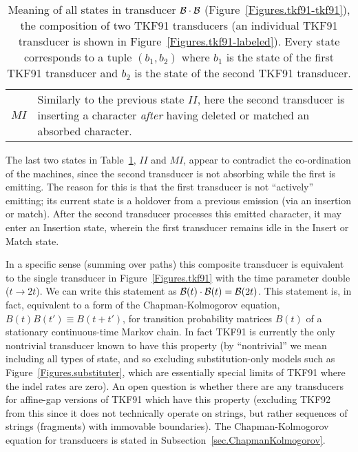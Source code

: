 \documentclass{article}
\newcommand{\secref}[1]{Subsection~\ref{sec.#1}}
\newcommand{\tabnum}[1]{\ref{tab.#1}}
\newcommand{\tabref}[1]{Table~\tabnum{#1}}
\newcommand{\tablabel}[1]{\label{tab.#1}}
\newcommand{\figref}[1]{Figure~\ref{Figures.#1}}
\newcommand\tkf{{\cal B}}
\begin{document}
\begin{table}
\begin{tabular}{c|p{}}
$MI$ & Similarly to the previous state $II$, here the second transducer is inserting a character {\em after} having deleted or matched an absorbed character. \\
\end{tabular}
\caption{ \tablabel{tkf91-tkf91} Meaning of all states in
transducer $\tkf \cdot \tkf$ (\figref{tkf91-tkf91}),
the composition of two TKF91 transducers
(an individual TKF91 transducer is shown in \figref{tkf91-labeled}).
Every state corresponds to a tuple $(b_1,b_2)$
where
$b_1$ is the state of the first TKF91 transducer and
$b_2$ is the state of the second TKF91 transducer.
 }
\end{table}

The last two states in \tabref{tkf91-tkf91}, $II$ and $MI$, appear to contradict the co-ordination of the machines, 
since the second transducer is not absorbing while the first is emitting. 
The reason for this is that the first transducer is not ``actively'' emitting; 
its current state is a holdover from a previous emission (via an insertion or match). 
After the second transducer processes this emitted character, it may enter an Insertion 
state, wherein the first transducer remains idle in the Insert or Match state. 



In a specific sense (summing over paths)
this composite transducer is equivalent to the single transducer in \figref{tkf91}
with the time parameter double ($t \to 2t$).
We can write this statement as $\tkf(t) \cdot \tkf(t) = \tkf(2t)$.
This statement is, in fact, equivalent to a form of the Chapman-Kolmogorov equation,
$B(t)B(t') \equiv B(t+t')$,
for transition probability matrices $B(t)$ of a stationary continuous-time Markov chain.
In fact TKF91 is currently the only nontrivial transducer known to have this property
(by ``nontrivial'' we mean including all types of state, and so excluding substitution-only models such as \figref{substituter},
which are essentially special limits of TKF91 where the indel rates are zero).
An open question is whether there are any transducers for affine-gap versions of TKF91 which
have this property
(excluding TKF92 from this since it does not technically operate on strings, but rather
sequences of strings (fragments) with immovable boundaries).  
The Chapman-Kolmogorov equation for transducers
is stated in \secref{ChapmanKolmogorov}.
\end{document}
